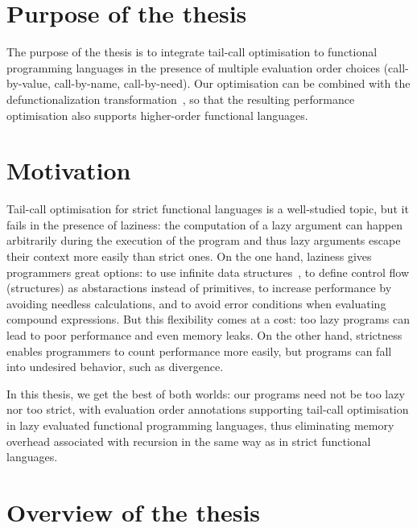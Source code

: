 \documentclass[diploma]{softlab-thesis}
\begin{document}
\section {Purpose of the thesis}

The purpose of the thesis is to integrate tail-call optimisation to functional programming languages 
in the presence of multiple evaluation order choices (call-by-value, call-by-name, call-by-need). Our optimisation can be combined with the 
defunctionalization transformation~\cite{Reynolds72definitionalinterpreters}, so that the resulting performance optimisation also supports
higher-order functional languages. 

\section {Motivation}

Tail-call optimisation for strict functional languages is a well-studied topic, but it fails in the 
presence of laziness: the computation of a lazy argument can happen arbitrarily during the execution 
of the program and thus lazy arguments escape their context more easily than strict ones.
On the one hand, laziness gives programmers great options: to use infinite data structures~\cite{Abel13}, 
to define control flow (structures) as abstaractions instead of primitives, to increase performance
by avoiding needless calculations, and to avoid error conditions when evaluating compound expressions.
But this flexibility comes at a cost: too lazy programs can lead to poor performance and even memory leaks.
On the other hand, strictness enables programmers to count performance more easily, but programs can 
fall into undesired behavior, such as divergence.

In this thesis, we get the best of both worlds: our programs need not be too lazy nor too strict,
with evaluation order annotations supporting tail-call optimisation in lazy evaluated 
functional programming languages, thus eliminating memory overhead associated with recursion in the 
same way as in strict functional languages.

\section {Overview of the thesis}
\end{document}

